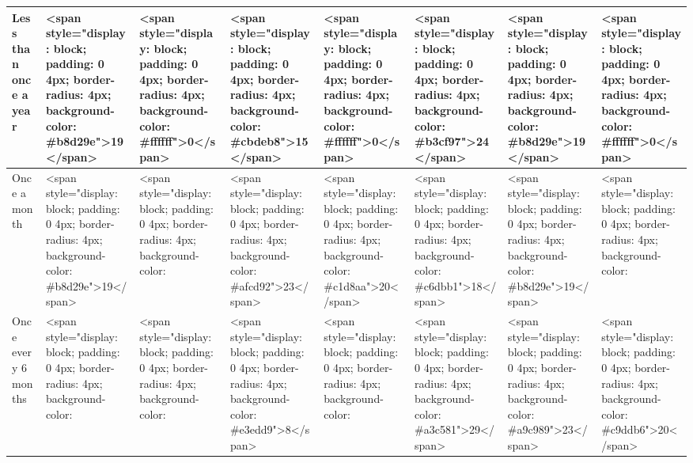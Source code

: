 \documentclass[
]{article}
\begin{document}
\begin{table}
\begin{tabular}[t]{l|l|l|l|l|l|l|l}
\hline
\hspace{1em}Less than once a year & <span style="display: block; padding: 0 4px; border-radius: 4px; background-color: #b8d29e">19</span> & <span style="display: block; padding: 0 4px; border-radius: 4px; background-color: #ffffff">0</span> & <span style="display: block; padding: 0 4px; border-radius: 4px; background-color: #cbdeb8">15</span> & <span style="display: block; padding: 0 4px; border-radius: 4px; background-color: #ffffff">0</span> & <span style="display: block; padding: 0 4px; border-radius: 4px; background-color: #b3cf97">24</span> & <span style="display: block; padding: 0 4px; border-radius: 4px; background-color: #b8d29e">19</span> & <span style="display: block; padding: 0 4px; border-radius: 4px; background-color: #ffffff">0</span>\\
\hline
\hspace{1em}Once a month & <span style="display: block; padding: 0 4px; border-radius: 4px; background-color: #b8d29e">19</span> & <span style="display: block; padding: 0 4px; border-radius: 4px; background-color: #84b256">33</span> & <span style="display: block; padding: 0 4px; border-radius: 4px; background-color: #afcd92">23</span> & <span style="display: block; padding: 0 4px; border-radius: 4px; background-color: #c1d8aa">20</span> & <span style="display: block; padding: 0 4px; border-radius: 4px; background-color: #c6dbb1">18</span> & <span style="display: block; padding: 0 4px; border-radius: 4px; background-color: #b8d29e">19</span> & <span style="display: block; padding: 0 4px; border-radius: 4px; background-color: #5f9b24">60</span>\\
\hline
\hspace{1em}Once every 6 months & <span style="display: block; padding: 0 4px; border-radius: 4px; background-color: #8bb760">31</span> & <span style="display: block; padding: 0 4px; border-radius: 4px; background-color: #84b256">33</span> & <span style="display: block; padding: 0 4px; border-radius: 4px; background-color: #e3edd9">8</span> & <span style="display: block; padding: 0 4px; border-radius: 4px; background-color: #83b155">40</span> & <span style="display: block; padding: 0 4px; border-radius: 4px; background-color: #a3c581">29</span> & <span style="display: block; padding: 0 4px; border-radius: 4px; background-color: #a9c989">23</span> & <span style="display: block; padding: 0 4px; border-radius: 4px; background-color: #c9ddb6">20</span>\\
\hline

\end{tabular}
\end{table}
\end{document}

